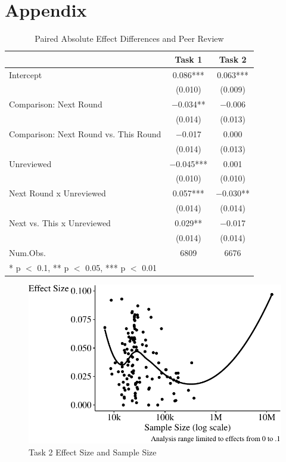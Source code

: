 \documentclass[
  letterpaper,
  DIV=11,
  numbers=noendperiod]{scrartcl}
\begin{document}
\hypertarget{appendix}{%
\section{Appendix}\label{appendix}}

\begin{table}
\centering
\caption{Paired Absolute Effect Differences and Peer Review \label{tab-peer-review-reg}}
\centering
\begin{tabular}[t]{lcc}
\toprule
  & Task 1 & Task 2\\
\midrule
Intercept & \num{0.086}*** & \num{0.063}***\\
 & (\num{0.010}) & (\num{0.009})\\
Comparison: Next Round & \num{-0.034}** & \num{-0.006}\\
 & (\num{0.014}) & \vphantom{1} (\num{0.013})\\
Comparison: Next Round vs. This Round & \num{-0.017} & \num{0.000}\\
 & (\num{0.014}) & (\num{0.013})\\
Unreviewed & \num{-0.045}*** & \num{0.001}\\
 & (\num{0.010}) & (\num{0.010})\\
Next Round x Unreviewed & \num{0.057}*** & \num{-0.030}**\\
 & (\num{0.014}) & \vphantom{1} (\num{0.014})\\
Next vs. This x Unreviewed & \num{0.029}** & \num{-0.017}\\
 & (\num{0.014}) & (\num{0.014})\\
\midrule
Num.Obs. & \num{6809} & \num{6676}\\
\bottomrule
\multicolumn{3}{l}{\rule{0pt}{1em}* p $<$ 0.1, ** p $<$ 0.05, *** p $<$ 0.01}\\
\end{tabular}
\end{table}

\begin{figure}

{\centering \includegraphics{The-Sources-of-Researcher-Variation-in-Economics_files/figure-pdf/fig-effect-vs-sample-1.pdf}

}

\caption{\label{fig-effect-vs-sample}Task 2 Effect Size and Sample Size}

\end{figure}
\end{document}
